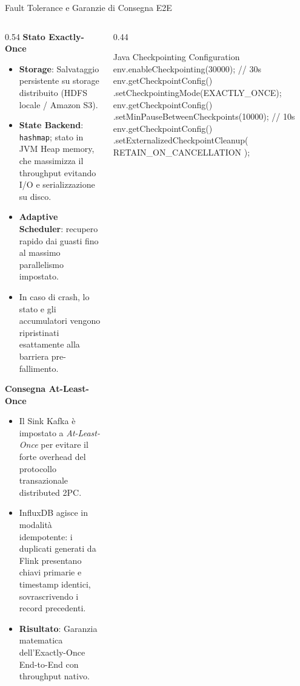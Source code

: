 \documentclass[10pt, aspectratio=169]{beamer}
\begin{document}
\begin{frame}[fragile]{Fault Tolerance e Garanzie di Consegna E2E}
    \begin{columns}[c]
        \begin{column}{0.54\textwidth}
            \textbf{Stato Exactly-Once}
            \begin{itemize}
                \scriptsize
                \item \textbf{Storage}: Salvataggio persistente su storage distribuito (HDFS locale / Amazon S3).
                \item \textbf{State Backend}: \texttt{hashmap}; stato in JVM Heap memory, che massimizza il throughput evitando I/O e serializzazione su disco.
                \item \textbf{Adaptive Scheduler}: recupero rapido dai guasti fino al massimo parallelismo impostato.
                \item In caso di crash, lo stato e gli accumulatori vengono ripristinati esattamente alla barriera pre-fallimento.
            \end{itemize}
            \textbf{Consegna At-Least-Once}
            \begin{itemize}
                \scriptsize
                \item Il Sink Kafka è impostato a \textit{At-Least-Once} per evitare il forte overhead del protocollo transazionale distributed 2PC.
                \item InfluxDB agisce in modalità idempotente: i duplicati generati da Flink presentano chiavi primarie e timestamp identici, sovrascrivendo i record precedenti.
                \item \textbf{Risultato}: Garanzia matematica dell'Exactly-Once End-to-End con throughput nativo.
            \end{itemize}
        \end{column}

        \begin{column}{0.44\textwidth}
            \centering
            \begin{flinkcodebox}{Java Checkpointing Configuration}
env.enableCheckpointing(30000); // 30s
env.getCheckpointConfig()
    .setCheckpointingMode(EXACTLY_ONCE);
env.getCheckpointConfig()
    .setMinPauseBetweenCheckpoints(10000); // 10s
env.getCheckpointConfig()
    .setExternalizedCheckpointCleanup(
        RETAIN_ON_CANCELLATION
    );
            \end{flinkcodebox}
        \end{column}
    \end{columns}
\end{frame}
\end{document}

